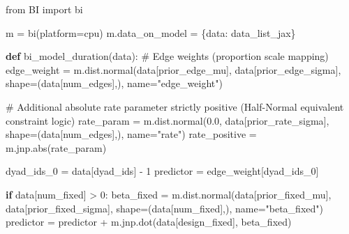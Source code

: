 \documentclass[
  letterpaper,
  DIV=11,
  numbers=noendperiod]{scrartcl}
\newenvironment{Shaded}{\begin{snugshade}}{\end{snugshade}}
\newcommand{\BuiltInTok}[1]{\textcolor[rgb]{0.00,0.23,0.31}{#1}}
\newcommand{\CommentTok}[1]{\textcolor[rgb]{0.37,0.37,0.37}{#1}}
\newcommand{\ControlFlowTok}[1]{\textcolor[rgb]{0.00,0.23,0.31}{\textbf{#1}}}
\newcommand{\DecValTok}[1]{\textcolor[rgb]{0.68,0.00,0.00}{#1}}
\newcommand{\FloatTok}[1]{\textcolor[rgb]{0.68,0.00,0.00}{#1}}
\newcommand{\ImportTok}[1]{\textcolor[rgb]{0.00,0.46,0.62}{#1}}
\newcommand{\KeywordTok}[1]{\textcolor[rgb]{0.00,0.23,0.31}{\textbf{#1}}}
\newcommand{\NormalTok}[1]{\textcolor[rgb]{0.00,0.23,0.31}{#1}}
\newcommand{\OperatorTok}[1]{\textcolor[rgb]{0.37,0.37,0.37}{#1}}
\newcommand{\StringTok}[1]{\textcolor[rgb]{0.13,0.47,0.30}{#1}}
\begin{document}
\begin{Shaded}
\begin{Highlighting}[]
\ImportTok{from}\NormalTok{ BI }\ImportTok{import}\NormalTok{ bi}

\NormalTok{m }\OperatorTok{=}\NormalTok{ bi(platform}\OperatorTok{=}\StringTok{\textquotesingle{}cpu\textquotesingle{}}\NormalTok{)}
\NormalTok{m.data\_on\_model }\OperatorTok{=}\NormalTok{ \{}\StringTok{\textquotesingle{}data\textquotesingle{}}\NormalTok{: data\_list\_jax\} }

\KeywordTok{def}\NormalTok{ bi\_model\_duration(data):}
    \CommentTok{\# Edge weights (proportion scale mapping)}
\NormalTok{    edge\_weight }\OperatorTok{=}\NormalTok{ m.dist.normal(data[}\StringTok{\textquotesingle{}prior\_edge\_mu\textquotesingle{}}\NormalTok{], data[}\StringTok{\textquotesingle{}prior\_edge\_sigma\textquotesingle{}}\NormalTok{], }
\NormalTok{                                shape}\OperatorTok{=}\NormalTok{(data[}\StringTok{\textquotesingle{}num\_edges\textquotesingle{}}\NormalTok{],), name}\OperatorTok{=}\StringTok{"edge\_weight"}\NormalTok{)}
    
    \CommentTok{\# Additional absolute rate parameter strictly positive (Half{-}Normal equivalent constraint logic)}
\NormalTok{    rate\_param }\OperatorTok{=}\NormalTok{ m.dist.normal(}\FloatTok{0.0}\NormalTok{, data[}\StringTok{\textquotesingle{}prior\_rate\_sigma\textquotesingle{}}\NormalTok{], }
\NormalTok{                               shape}\OperatorTok{=}\NormalTok{(data[}\StringTok{\textquotesingle{}num\_edges\textquotesingle{}}\NormalTok{],), name}\OperatorTok{=}\StringTok{"rate"}\NormalTok{)}
\NormalTok{    rate\_positive }\OperatorTok{=}\NormalTok{ m.jnp.}\BuiltInTok{abs}\NormalTok{(rate\_param) }
    
\NormalTok{    dyad\_ids\_0 }\OperatorTok{=}\NormalTok{ data[}\StringTok{\textquotesingle{}dyad\_ids\textquotesingle{}}\NormalTok{] }\OperatorTok{{-}} \DecValTok{1}
\NormalTok{    predictor }\OperatorTok{=}\NormalTok{ edge\_weight[dyad\_ids\_0]}
    
    \ControlFlowTok{if}\NormalTok{ data[}\StringTok{\textquotesingle{}num\_fixed\textquotesingle{}}\NormalTok{] }\OperatorTok{\textgreater{}} \DecValTok{0}\NormalTok{:}
\NormalTok{        beta\_fixed }\OperatorTok{=}\NormalTok{ m.dist.normal(data[}\StringTok{\textquotesingle{}prior\_fixed\_mu\textquotesingle{}}\NormalTok{], data[}\StringTok{\textquotesingle{}prior\_fixed\_sigma\textquotesingle{}}\NormalTok{], }
\NormalTok{                                   shape}\OperatorTok{=}\NormalTok{(data[}\StringTok{\textquotesingle{}num\_fixed\textquotesingle{}}\NormalTok{],), name}\OperatorTok{=}\StringTok{"beta\_fixed"}\NormalTok{)}
\NormalTok{        predictor }\OperatorTok{=}\NormalTok{ predictor }\OperatorTok{+}\NormalTok{ m.jnp.dot(data[}\StringTok{\textquotesingle{}design\_fixed\textquotesingle{}}\NormalTok{], beta\_fixed)}


\end{Highlighting}
\end{Shaded}
\end{document}
